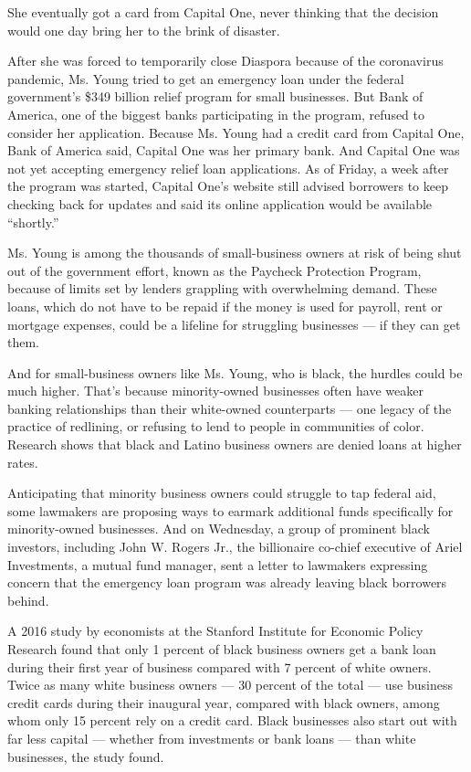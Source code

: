 She eventually got a card from Capital One, never thinking that the
decision would one day bring her to the brink of disaster.

After she was forced to temporarily close Diaspora because of the
coronavirus pandemic, Ms. Young tried to get an emergency loan under the
federal government's \$349 billion relief program for small businesses.
But Bank of America, one of the biggest banks participating in the
program, refused to consider her application. Because Ms. Young had a
credit card from Capital One, Bank of America said, Capital One was her
primary bank. And Capital One was not yet accepting emergency relief
loan applications. As of Friday, a week after the program was started,
Capital One's website still advised borrowers to keep checking back for
updates and said its online application would be available ``shortly.''

Ms. Young is among the thousands of small-business owners at risk of
being shut out of the government effort, known as the Paycheck
Protection Program, because of limits set by lenders grappling with
overwhelming demand. These loans, which do not have to be repaid if the
money is used for payroll, rent or mortgage expenses, could be a
lifeline for struggling businesses --- if they can get them.

And for small-business owners like Ms. Young, who is black, the hurdles
could be much higher. That's because minority-owned businesses often
have weaker banking relationships than their white-owned counterparts
--- one legacy of the practice of redlining, or refusing to lend to
people in communities of color. Research shows that black and Latino
business owners are denied loans at higher rates.

Anticipating that minority business owners could struggle to tap federal
aid, some lawmakers are proposing ways to earmark additional funds
specifically for minority-owned businesses. And on Wednesday, a group of
prominent black investors, including John W. Rogers Jr., the billionaire
co-chief executive of Ariel Investments, a mutual fund manager, sent a
letter to lawmakers expressing concern that the emergency loan program
was already leaving black borrowers behind.

A 2016 study by economists at the Stanford Institute for Economic Policy
Research found that only 1 percent of black business owners get a bank
loan during their first year of business compared with 7 percent of
white owners. Twice as many white business owners --- 30 percent of the
total --- use business credit cards during their inaugural year,
compared with black owners, among whom only 15 percent rely on a credit
card. Black businesses also start out with far less capital --- whether
from investments or bank loans --- than white businesses, the study
found.

